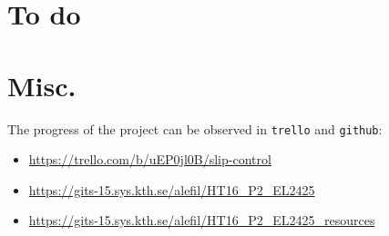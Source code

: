 \documentclass[oneside,12pt]{article}
\begin{document}
\section{To do}



\section{Misc.}

The progress of the project can be observed in \texttt{trello} and \texttt{github}:

\begin{itemize}
  \item \url{https://trello.com/b/uEP0jl0B/slip-control}
  \item \url{https://gits-15.sys.kth.se/alefil/HT16_P2_EL2425}
  \item \url{https://gits-15.sys.kth.se/alefil/HT16_P2_EL2425_resources}
\end{itemize}
\end{document}
